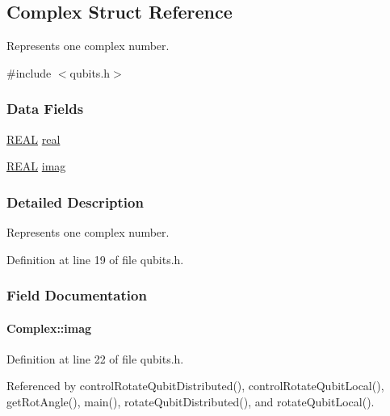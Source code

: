 \hypertarget{structComplex}{}\subsection{Complex Struct Reference}
\label{structComplex}


Represents one complex number.  




{\ttfamily \#include $<$qubits.\+h$>$}

\subsubsection*{Data Fields}
\begin{DoxyCompactItemize}
\item 
\hyperlink{precision_8h_a4b654506f18b8bfd61ad2a29a7e38c25}{R\+E\+AL} \hyperlink{structComplex_a479ad939835457595fcca3ca55c06283}{real}
\item 
\hyperlink{precision_8h_a4b654506f18b8bfd61ad2a29a7e38c25}{R\+E\+AL} \hyperlink{structComplex_a1151948284b21c0052f203f23ab931d9}{imag}
\end{DoxyCompactItemize}


\subsubsection{Detailed Description}
Represents one complex number. 

Definition at line 19 of file qubits.\+h.



\subsubsection{Field Documentation}
\paragraph[{\texorpdfstring{imag}{imag}}]{ Complex\+::imag}\hypertarget{structComplex_a1151948284b21c0052f203f23ab931d9}{}\label{structComplex_a1151948284b21c0052f203f23ab931d9}


Definition at line 22 of file qubits.\+h.



Referenced by control\+Rotate\+Qubit\+Distributed(), control\+Rotate\+Qubit\+Local(), get\+Rot\+Angle(), main(), rotate\+Qubit\+Distributed(), and rotate\+Qubit\+Local().

